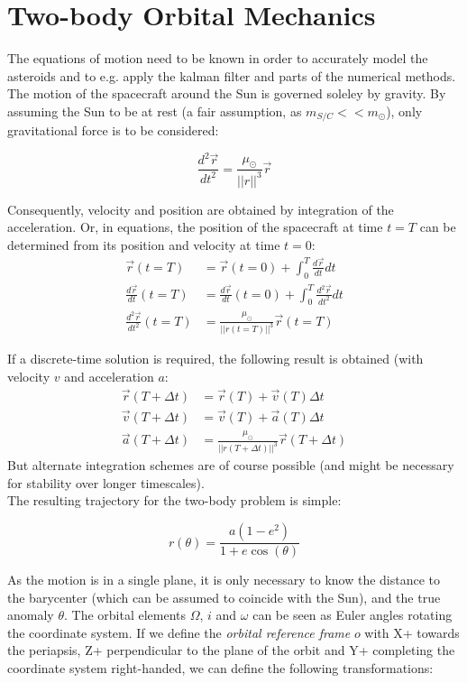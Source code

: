 \documentclass[a4paper,10pt]{article}
\begin{document}
\section{Two-body Orbital Mechanics}

The equations of motion need to be known in order to accurately model the asteroids and to e.g. apply the kalman filter and parts of the numerical methods. The motion of the spacecraft around the Sun is governed soleley by gravity. By assuming the Sun to be at rest (a fair assumption, as $m_{S/C} << m_\odot$), only gravitational force is to be considered:

\begin{equation}
 \frac{d^2 \vec{r}}{dt^2} = \frac{\mu_\odot}{||r||^3}\vec{r}
\end{equation}

Consequently, velocity and position are obtained by integration of the acceleration. Or, in equations, the position of the spacecraft at time $t=T$ can be determined from its position and velocity at time $t=0$:
\begin{align}
\vec{r}(t=T) &= \vec{r}(t=0) + \int_0^T \frac{d \vec{r}}{dt} dt \\
\frac{d \vec{r}}{dt}(t=T) &= \frac{d \vec{r}}{dt}(t=0) + \int_0^T \frac{d^2 \vec{r}}{dt^2} dt \\
\frac{d^2 \vec{r}}{dt^2}(t=T) &= \frac{\mu_\odot}{||r(t=T)||^3}\vec{r}(t=T)
\end{align}

If a discrete-time solution is required, the following result is obtained (with velocity $v$ and acceleration $a$:
\begin{align}
 \vec{r}(T+\Delta t) &= \vec{r}(T) + \vec{v}(T)\Delta t \\
 \vec{v}(T+\Delta t) &= \vec{v}(T) + \vec{a}(T)\Delta t \\
 \vec{a}(T+\Delta t) &= \frac{\mu_\odot}{||r(T+\Delta t)||^3}\vec{r}(T + \Delta t)
\end{align}
But alternate integration schemes are of course possible (and might be necessary for stability over longer timescales).\\

The resulting trajectory for the two-body problem is simple:

\begin{equation}
 r(\theta) = \frac{a(1-e^2)}{1+e \cos (\theta)}
\end{equation}

As the motion is in a single plane, it is only necessary to know the distance to the barycenter (which can be assumed to coincide with the Sun), and the true anomaly $\theta$. The orbital elements $\Omega$, $i$ and $\omega$ can be seen as Euler angles rotating the coordinate system. If we define the \textit{orbital reference frame} $o$ with X+ towards the periapsis, Z+ perpendicular to the plane of the orbit and Y+ completing the coordinate system right-handed, we can define the following transformations:
\end{document}
